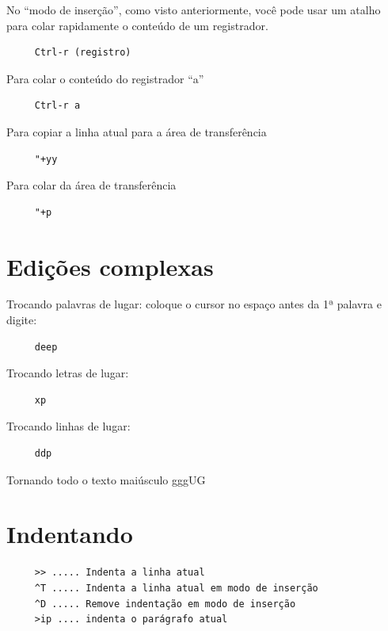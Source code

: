 \documentclass[10pt,a4paper,openany]{book}
\begin{document}
No ``modo de inserção'', como visto anteriormente, você pode usar um atalho
para colar rapidamente o conteúdo de um registrador.

\begin{verbatim}
     Ctrl-r (registro)
\end{verbatim}

Para colar o conteúdo do registrador ``a''

\begin{verbatim}
     Ctrl-r a
\end{verbatim}

Para copiar a linha atual para a área de transferência

\begin{verbatim}
     "+yy
\end{verbatim}

Para colar da área de transferência

\begin{verbatim}
     "+p
\end{verbatim}

\section{Edições complexas }
\label{Edições complexas }

Trocando palavras de lugar: coloque o cursor no espaço antes da 1ª palavra e digite:

\begin{verbatim}
     deep
\end{verbatim}

Trocando letras de lugar:

\begin{verbatim}
     xp
\end{verbatim}

Trocando linhas de lugar:

\begin{verbatim}
     ddp
\end{verbatim}

Tornando todo o texto maiúsculo
 gggUG

\section{Indentando }

\begin{verbatim}
     >> ..... Indenta a linha atual
     ^T ..... Indenta a linha atual em modo de inserção
     ^D ..... Remove indentação em modo de inserção
     >ip .... indenta o parágrafo atual
\end{verbatim}
\end{document}
